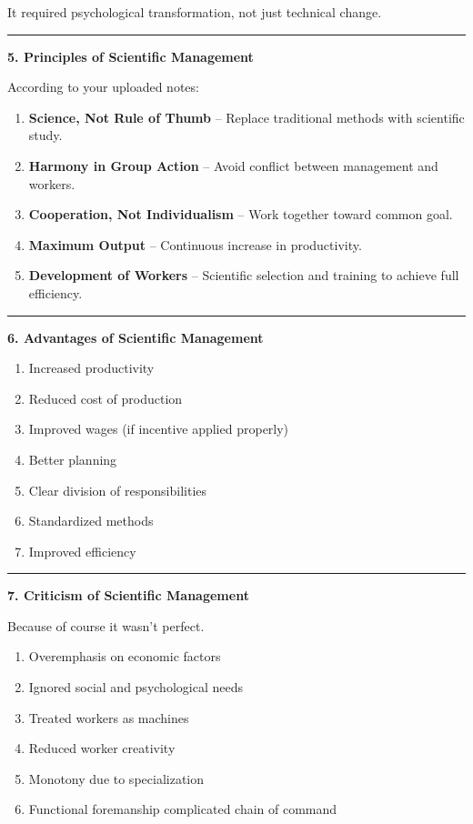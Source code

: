 \documentclass[10pt,a4paper]{article}
\newcommand{\separator}{\vspace{0.4em}\noindent\rule{\linewidth}{0.6pt}\vspace{0.4em}}
\begin{document}
It required psychological transformation, not just technical change.

\separator

\textbf{5. Principles of Scientific Management}

According to your uploaded notes:

\begin{enumerate}
  \item \textbf{Science, Not Rule of Thumb} -- Replace traditional methods with scientific study.
  \item \textbf{Harmony in Group Action} -- Avoid conflict between management and workers.
  \item \textbf{Cooperation, Not Individualism} -- Work together toward common goal.
  \item \textbf{Maximum Output} -- Continuous increase in productivity.
  \item \textbf{Development of Workers} -- Scientific selection and training to achieve full efficiency.
\end{enumerate}

\separator

\textbf{6. Advantages of Scientific Management}

\begin{enumerate}
  \item Increased productivity
  \item Reduced cost of production
  \item Improved wages (if incentive applied properly)
  \item Better planning
  \item Clear division of responsibilities
  \item Standardized methods
  \item Improved efficiency
\end{enumerate}

\separator

\textbf{7. Criticism of Scientific Management}

Because of course it wasn't perfect.

\begin{enumerate}
  \item Overemphasis on economic factors
  \item Ignored social and psychological needs
  \item Treated workers as machines
  \item Reduced worker creativity
  \item Monotony due to specialization
  \item Functional foremanship complicated chain of command
\end{enumerate}
\end{document}
